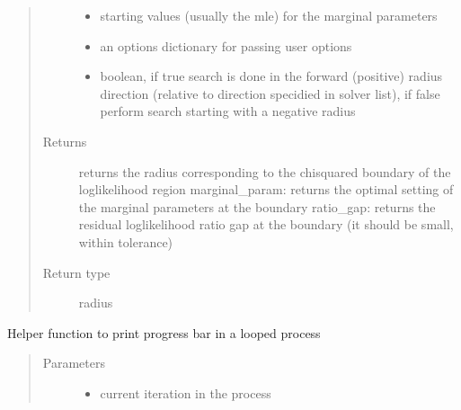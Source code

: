 \documentclass[letterpaper,10pt,english,openany,oneside]{sphinxmanual}
\begin{document}
\begin{fulllineitems}
\begin{fulllineitems}
\begin{quote}
\begin{description}
\begin{itemize}
\item {} 
 \textendash{} starting values (usually the mle) for the marginal parameters

\item {} 
 \textendash{} an options dictionary for passing user options

\item {} 
 \textendash{} boolean,  if true search is done in the forward (positive) radius direction (relative to direction specidied in solver list),  if false perform search starting with a negative radius

\end{itemize}

\item[{Returns}] \leavevmode
returns the radius corresponding to the chi\sphinxhyphen{}squared boundary of the loglikelihood region
marginal\_param: returns the optimal setting of the marginal parameters at the boundary
ratio\_gap: returns the residual loglikelihood ratio gap at the boundary (it should be small,  within tolerance)

\item[{Return type}] \leavevmode
radius

\end{description}\end{quote}

\end{fulllineitems}


\begin{fulllineitems}
\label{\detokenize{nloed:nloed.model.Model.__creategrid}}
\end{fulllineitems}


\begin{fulllineitems}
\label{\detokenize{nloed:nloed.model.Model._progress_bar}}
Helper function to print progress bar in a looped process
\begin{quote}\begin{description}
\item[{Parameters}] \leavevmode\begin{itemize}
\item {} 
 \textendash{} current iteration in the process


\end{itemize}
\end{description}
\end{quote}
\end{fulllineitems}
\end{fulllineitems}
\end{document}
